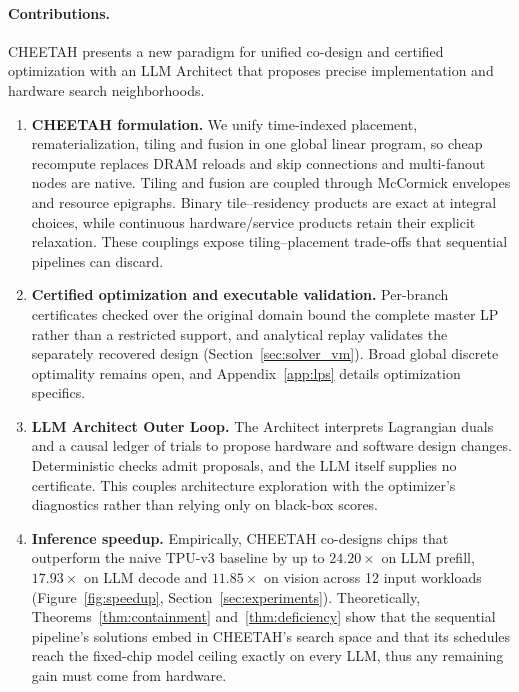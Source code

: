 \paragraph{Contributions.} CHEETAH presents a new paradigm for unified co-design
and certified optimization with an LLM Architect that proposes precise implementation and hardware search neighborhoods.
\begin{enumerate}

\item \textbf{CHEETAH formulation.}
    We unify time-indexed placement, rematerialization, tiling and fusion in one global linear program, so cheap recompute replaces DRAM reloads and skip connections and multi-fanout nodes are native.
Tiling and fusion are coupled through McCormick envelopes and resource epigraphs.
Binary tile--residency products are exact at integral choices, while continuous hardware/service products retain their explicit relaxation.
These couplings expose tiling--placement trade-offs that sequential pipelines can discard.
    \item \textbf{Certified optimization and executable validation.} Per-branch
    certificates checked over the original domain bound the complete master LP rather than a restricted support, and analytical replay validates the separately recovered design (Section~\ref{sec:solver_vm}).
Broad global discrete optimality remains open, and Appendix~\ref{app:lps} details optimization specifics. 

    \item \textbf{LLM Architect Outer Loop.} The Architect interprets Lagrangian duals and a causal ledger of trials to propose hardware and software design changes.
Deterministic checks admit proposals, and the LLM itself supplies no certificate.
This couples architecture exploration with the optimizer's diagnostics rather than relying only on black-box scores. 

    \item \textbf{Inference speedup.} Empirically, CHEETAH co-designs
    chips that outperform the naive TPU-v3 baseline by up to $24.20\times$ on LLM prefill, $17.93\times$ on LLM decode and $11.85\times$ on vision across 12 input workloads (Figure~\ref{fig:speedup}, Section~\ref{sec:experiments}).
Theoretically, Theorems~\ref{thm:containment} and~\ref{thm:deficiency} show that the sequential pipeline's solutions embed in CHEETAH's search space and that its schedules reach the fixed-chip model ceiling exactly on every LLM, thus any remaining gain must come from hardware.
\end{enumerate}

